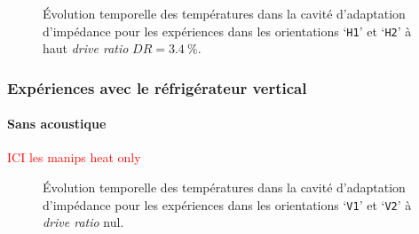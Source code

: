 \begin{figure}[!ht]
    \centering
    
    \caption{\'Evolution temporelle des températures dans la cavité d'adaptation d'impédance pour les expériences dans les orientations `\texttt{H1}' et `\texttt{H2}' à haut \textit{drive ratio} $DR=\qty{3.4}{\percent}$.}
    \label{fig:Acou_CHXout_H1H2_High}
\end{figure}


\subsubsection{Expériences avec le réfrigérateur vertical}
\paragraph{Sans acoustique}
\textcolor{red}{ICI les manips heat only}

\begin{figure}[!ht]
    \centering
    
    \caption{\'Evolution temporelle des températures dans la cavité d'adaptation d'impédance pour les expériences dans les orientations `\texttt{V1}' et `\texttt{V2}' à \textit{drive ratio} nul.}
    \label{fig:HeatOnly_CHXout_V1V2}
\end{figure}

